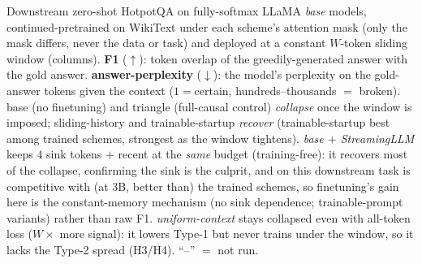 \begin{table}[t]
\caption{Downstream zero-shot HotpotQA on fully-softmax LLaMA \emph{base} models, continued-pretrained on WikiText under each scheme's attention mask (only the mask differs, never the data or task) and deployed at a constant $W$-token sliding window (columns). \textbf{F1} ($\uparrow$): token overlap of the greedily-generated answer with the gold answer. \textbf{answer-perplexity} ($\downarrow$): the model's perplexity on the gold-answer tokens given the context ($1{=}$certain, hundreds--thousands ${=}$ broken). base (no finetuning) and triangle (full-causal control) \emph{collapse} once the window is imposed; sliding-history and trainable-startup \emph{recover} (trainable-startup best among trained schemes, strongest as the window tightens). \emph{base $+$ StreamingLLM} keeps $4$ sink tokens $+$ recent at the \emph{same} budget (training-free): it recovers most of the collapse, confirming the sink is the culprit, and on this downstream task is competitive with (at $3$B, better than) the trained schemes, so finetuning's gain here is the constant-memory mechanism (no sink dependence; trainable-prompt variants) rather than raw F1. \emph{uniform-context} stays collapsed even with all-token loss ($W{\times}$ more signal): it lowers Type-1 but never trains under the window, so it lacks the Type-2 spread (H3/H4). ``--'' $=$ not run.}
\label{tab:llama}
\end{table}

